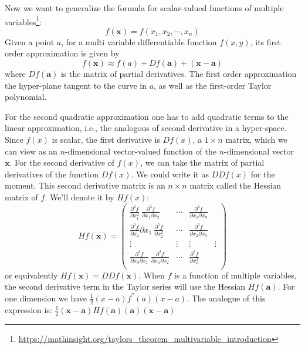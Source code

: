\documentclass[12pt, letterpaper]{article}
\theoremstyle{definition}
\newcommand{\x}{\mathbf{x}}
\begin{document}
Now we want to generalize the formula for scalar-valued functions of multiple variables\footnote{\url{https://mathinsight.org/taylors_theorem_multivariable_introduction}}:
\begin{equation}
f(\x) = f(x_1, x_2, \cdots,x_n)
\end{equation}
Given a point $a$, for a multi variable differentiable function $f(x,y)$, its first order approximation is given by
\begin{equation}
f(\x) \approx f(a) + Df(\mathbf{a}) + (\x -\mathbf{a})
\end{equation}
where $Df(\mathbf{a})$ is the matrix of partial derivatives. The first order approximation the hyper-plane tangent to the curve in $a$, as well as the first-order Taylor polynomial.

For the second quadratic approximation one has to add quadratic terms to the linear approximation, i.e., the analogous of second derivative in a hyper-space. Since $f(x)$ is scalar, the first derivative is $Df(x)$, a $1\times n$ matrix, which we can view as an $n$-dimensional vector-valued function of the $n$-dimensional vector $\x$. For the second derivative of $f(x)$, we can take the matrix of partial derivatives of the function $Df(x)$. We could write it as $DDf(x)$ for the moment. This second derivative matrix is an $n\times n$ matrix called the Hessian matrix of $f$. We'll denote it by $Hf(x)$:
\begin{equation}
Hf(\x) =\begin{pmatrix}
\frac{\partial^2 f}{\partial x_1^2}\ \frac{\partial^2 f}{ \partial x_1 \partial x_2} & \cdots & \frac{\partial^2 f}{\partial x_1 \partial x_n}\\
\frac{\partial^2 f}{\partial x_2} \partial x_1\ \frac{\partial^2 f}{ \partial x_2^2} & \cdots & \frac{\partial^2 f}{\partial x_2 \partial x_n}\\
\vdots&\vdots&\vdots&\vdots\\
\frac{\partial^2 f}{\partial x_n \partial x_1}\ \frac{\partial^2 f}{ \partial x_n \partial x_2} & \cdots & \frac{\partial^2 f}{\partial x_n^2}\\
\end{pmatrix}
\end{equation}
or equivalently $Hf(\x) = DDf(\x)$. When $f$ is a function of multiple variables, the second derivative term in the Taylor series will use the Hessian $Hf(\mathbf{a})$. For one dimension we have $\frac{1}{2}(x-a)f^{''}(a)(x-a)$. The analogue of this expression is: $\frac{1}{2}(\x-\mathbf{a})Hf(\mathbf{a})(\mathbf{a})(\x-\mathbf{a})$
\end{document}
